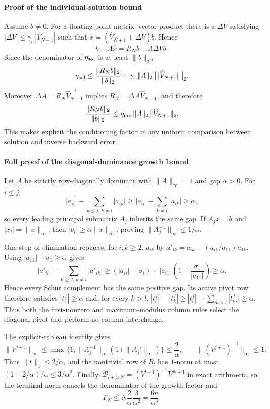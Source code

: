 \documentclass[supplement,review,onefignum,onetabnum]{siamart251216}
\begin{document}
\paragraph{Proof of the individual-solution bound}
Assume $b\ne0$. For a floating-point matrix--vector product there is a $\Delta V$ satisfying
$|\Delta V|\le\gamma_n|\widehat V_{N+1}|$ such that
$\widehat x=(\widehat V_{N+1}+\Delta V)b$. Hence
%
\[
b-A\widehat x=R_Nb-A\Delta Vb.
\]
%
Since the denominator of $\eta_{\rm sol}$ is at least $\|b\|_2$,
%
\[
\eta_{\rm sol}
\le
\frac{\|R_Nb\|_2}{\|b\|_2}
+
\gamma_n\|A\|_2\bigl\|\,|\widehat V_{N+1}|\,\bigr\|_2.
\]
%
Moreover $\Delta A=R_N\widehat V_{N+1}^{-1}$ implies
$R_N=\Delta A\widehat V_{N+1}$, and therefore
%
\[
\frac{\|R_Nb\|_2}{\|b\|_2}
\le
\eta_{\rm inv}\,\|A\|_2\,\|\widehat V_{N+1}\|_2.
\]
%
This makes explicit the conditioning factor in any uniform comparison between solution and inverse
backward error.

\paragraph{Full proof of the diagonal-dominance growth bound}
Let $A$ be strictly row-diagonally dominant with
$\|A\|_\infty=1$ and gap $\alpha>0$. For $i\le j$,
%
\[
|a_{ii}|-\sum_{k\le j,\,k\ne i}|a_{ik}|
\ge
|a_{ii}|-\sum_{k\ne i}|a_{ik}|
\ge\alpha,
\]
%
so every leading principal submatrix $A_j$ inherits the same gap. If $A_jx=b$ and
$|x_i|=\|x\|_\infty$, then
$|b_i|\ge\alpha\|x\|_\infty$, proving
$\|A_j^{-1}\|_\infty\le1/\alpha$.

One step of elimination replaces, for $i,k\ge2$,
$a_{ik}$ by $a'_{ik}=a_{ik}-(a_{i1}/a_{11})a_{1k}$. Using
$|a_{11}|-\sigma_1\ge\alpha$ gives
%
\[
|a'_{ii}|-\sum_{k\ge2,\,k\ne i}|a'_{ik}|
\ge
(|a_{ii}|-\sigma_i)
+
|a_{i1}|\left(1-\frac{\sigma_1}{|a_{11}|}\right)
\ge\alpha.
\]
%
Hence every Schur complement has the same positive gap. Its active pivot row therefore satisfies
$|t_l^{\,l}|\ge\alpha$ and, for every $k>l$,
$|t_l^{\,l}|-|t_k^{\,l}|\ge |t_l^{\,l}|-\sum_{m>l}|t_m^{\,l}|\ge\alpha$.
Thus both the first-nonzero and maximum-modulus column rules select the diagonal pivot and perform
no column interchange.

The explicit-tableau identity gives
%
\[
\|V^{j+1}\|_\infty
\le
\max\{1,\|A_j^{-1}\|_\infty(1+\|A_j'\|_\infty)\}
\le\frac{2}{\alpha},
\qquad
\|(V^{j+1})^{-1}\|_\infty\le1.
\]
%
Thus $\|t\|_1\le2/\alpha$, and the nontrivial row of $B_l$ has $1$-norm at most
$(1+2/\alpha)/\alpha\le3/\alpha^2$. Finally,
$\mathcal B_{l+1:N}=(V^{l+1})^{-1}V^{N+1}$ in exact arithmetic, so the terminal norm cancels the
denominator of the growth factor and
%
\[
\Gamma_N
\le
N\frac{2}{\alpha}\frac{3}{\alpha^2}
=
\frac{6n}{\alpha^3}.
\]
\end{document}
